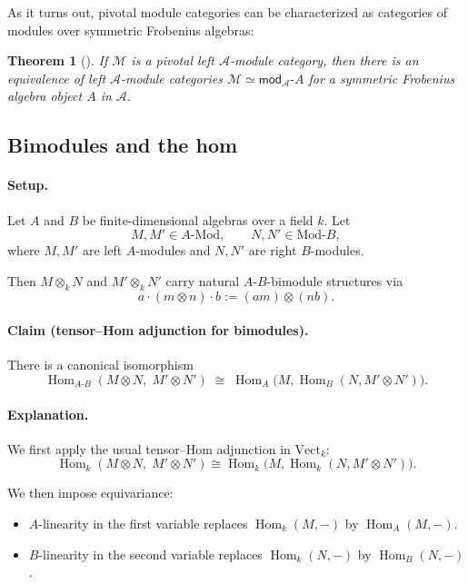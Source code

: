 \documentclass[11pt]{article}
\newtheorem{theorem}{Theorem}[section]
\theoremstyle{definition}
\begin{document}
As it turns out, pivotal module categories can be characterized as categories of modules over symmetric Frobenius algebras:

\begin{theorem}[{\cite[Corollary 3.16]{relserre}}]
If $\mathcal{M}$ is a pivotal left $\mathcal{A}$-module category, then there is an equivalence of left $\mathcal{A}$-module categories $\mathcal{M} \simeq \mathsf{mod}_\mathcal{A} \text{-}A$ for a symmetric Frobenius algebra object $A$ in $\mathcal{A}$.
\end{theorem}




\subsection{Bimodules and the hom}


\paragraph{Setup.}
Let $A$ and $B$ be finite-dimensional algebras over a field $k$.
Let
\[
M,M' \in A\text{-}\mathrm{Mod}, 
\qquad
N,N' \in \mathrm{Mod}\text{-}B,
\]
where $M,M'$ are left $A$-modules and $N,N'$ are right $B$-modules.

Then $M \otimes_k N$ and $M' \otimes_k N'$ carry natural $A$-$B$-bimodule structures via
\[
a \cdot (m \otimes n) \cdot b := (am) \otimes (nb).
\]

\paragraph{Claim (tensor–Hom adjunction for bimodules).}
There is a canonical isomorphism
\[
\operatorname{Hom}_{A\text{-}B}(M \otimes N,\; M' \otimes N')
\;\cong\;
\operatorname{Hom}_A\!\big(M,\operatorname{Hom}_B(N, M' \otimes N')\big).
\]

\paragraph{Explanation.}
We first apply the usual tensor–Hom adjunction in $\mathrm{Vect}_k$:
\[
\operatorname{Hom}_k(M \otimes N,\; M' \otimes N')
\cong
\operatorname{Hom}_k\!\big(M,\operatorname{Hom}_k(N, M' \otimes N')\big).
\]

We then impose equivariance:

\begin{itemize}
\item $A$-linearity in the first variable replaces $\operatorname{Hom}_k(M,-)$ by $\operatorname{Hom}_A(M,-)$.
\item $B$-linearity in the second variable replaces $\operatorname{Hom}_k(N,-)$ by $\operatorname{Hom}_B(N,-)$.
\end{itemize}
\end{document}
